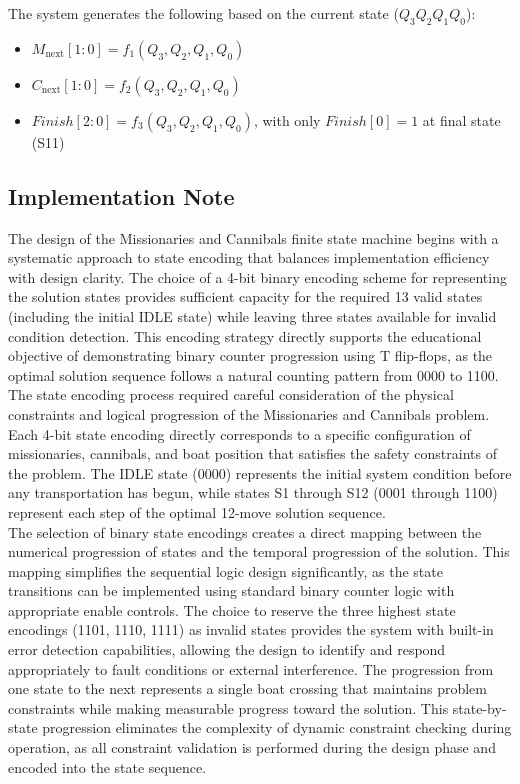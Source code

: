 \documentclass[10pt,a4paper]{article}
\begin{document}
The system generates the following based on the current state (\(Q_3 Q_2 Q_1 Q_0\)):

\begin{itemize}
  \item \(M_{\text{next}}[1:0] = f_1(Q_3, Q_2, Q_1, Q_0)\)
  \item \(C_{\text{next}}[1:0] = f_2(Q_3, Q_2, Q_1, Q_0)\)
  \item \(Finish[2:0] = f_3(Q_3, Q_2, Q_1, Q_0)\), with only \(Finish[0] = 1\) at final state (S11)
\end{itemize}


\subsection*{Implementation Note}

The design of the Missionaries and Cannibals finite state machine begins with a systematic approach to state encoding that balances implementation efficiency with design clarity. The choice of a 4-bit binary encoding scheme for representing the solution states provides sufficient capacity for the required 13 valid states (including the initial IDLE state) while leaving three states available for invalid condition detection. This encoding strategy directly supports the educational objective of demonstrating binary counter progression using T flip-flops, as the optimal solution sequence follows a natural counting pattern from 0000 to 1100.\\

\noindent The state encoding process required careful consideration of the physical constraints and logical progression of the Missionaries and Cannibals problem. Each 4-bit state encoding directly corresponds to a specific configuration of missionaries, cannibals, and boat position that satisfies the safety constraints of the problem. The IDLE state (0000) represents the initial system condition before any transportation has begun, while states S1 through S12 (0001 through 1100) represent each step of the optimal 12-move solution sequence.\\

\noindent The selection of binary state encodings creates a direct mapping between the numerical progression of states and the temporal progression of the solution. This mapping simplifies the sequential logic design significantly, as the state transitions can be implemented using standard binary counter logic with appropriate enable controls. The choice to reserve the three highest state encodings (1101, 1110, 1111) as invalid states provides the system with built-in error detection capabilities, allowing the design to identify and respond appropriately to fault conditions or external interference. The progression from one state to the next represents a single boat crossing that maintains problem constraints while making measurable progress toward the solution. This state-by-state progression eliminates the complexity of dynamic constraint checking during operation, as all constraint validation is performed during the design phase and encoded into the state sequence.
\end{document}
